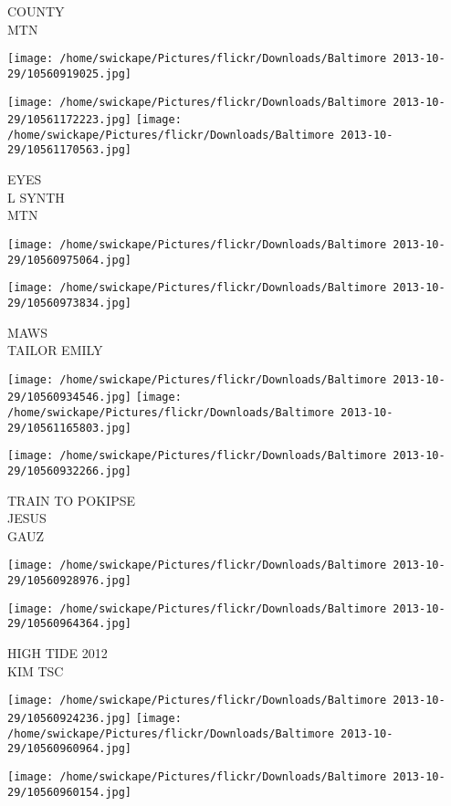 \documentclass[10pt,letterpaper]{article}
\begin{document}
COUNTY\\
MTN
\pagebreak

\texttt{[image: /home/swickape/Pictures/flickr/Downloads/Baltimore 2013-10-29/10560919025.jpg]}

\vspace{0.25in}
\texttt{[image: /home/swickape/Pictures/flickr/Downloads/Baltimore 2013-10-29/10561172223.jpg]}
\texttt{[image: /home/swickape/Pictures/flickr/Downloads/Baltimore 2013-10-29/10561170563.jpg]}

EYES\\
L SYNTH\\
MTN
\pagebreak

\texttt{[image: /home/swickape/Pictures/flickr/Downloads/Baltimore 2013-10-29/10560975064.jpg]}

\vspace{0.25in}
\texttt{[image: /home/swickape/Pictures/flickr/Downloads/Baltimore 2013-10-29/10560973834.jpg]}

MAWS\\
TAILOR EMILY
\pagebreak

\texttt{[image: /home/swickape/Pictures/flickr/Downloads/Baltimore 2013-10-29/10560934546.jpg]}
\texttt{[image: /home/swickape/Pictures/flickr/Downloads/Baltimore 2013-10-29/10561165803.jpg]}

\texttt{[image: /home/swickape/Pictures/flickr/Downloads/Baltimore 2013-10-29/10560932266.jpg]}

TRAIN TO POKIPSE\\
JESUS\\
GAUZ
\pagebreak

\texttt{[image: /home/swickape/Pictures/flickr/Downloads/Baltimore 2013-10-29/10560928976.jpg]}

\vspace{0.25in}
\texttt{[image: /home/swickape/Pictures/flickr/Downloads/Baltimore 2013-10-29/10560964364.jpg]}

HIGH TIDE 2012\\
KIM TSC
\pagebreak

\texttt{[image: /home/swickape/Pictures/flickr/Downloads/Baltimore 2013-10-29/10560924236.jpg]}
\texttt{[image: /home/swickape/Pictures/flickr/Downloads/Baltimore 2013-10-29/10560960964.jpg]}

\texttt{[image: /home/swickape/Pictures/flickr/Downloads/Baltimore 2013-10-29/10560960154.jpg]}
\end{document}
